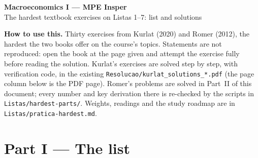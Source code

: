 \documentclass[11pt,a4paper]{article}
\begin{document}
\begin{center}
  {\Large\bfseries Macroeconomics I --- MPE Insper}\\[2pt]
  {\large The hardest textbook exercises on Listas 1--7: list and solutions}
\end{center}

\noindent\textbf{How to use this.} Thirty exercises from Kurlat (2020) and Romer (2012), the hardest
the two books offer on the course's topics. Statements are not reproduced: open the book at the
page given and attempt the exercise fully before reading the solution. Kurlat's exercises are solved
step by step, with verification code, in the existing \texttt{Resolucao/kurlat\_solutions\_*.pdf}
(the page column below is the PDF page). Romer's problems are solved in Part~II of this document;
every number and key derivation there is re-checked by the scripts in \texttt{Listas/hardest-parts/}.
Weights, readings and the study roadmap are in \texttt{Listas/pratica-hardest.md}.

\section*{Part I --- The list}
\end{document}
